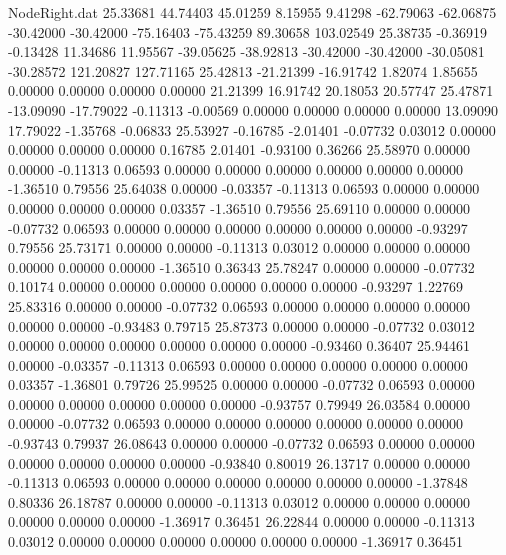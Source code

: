 \begin{filecontents}{NodeRight.dat}
  25.33681   44.74403   45.01259     8.15955    9.41298  -62.79063  -62.06875  -30.42000  -30.42000  -75.16403  -75.43259   89.30658  103.02549
  25.38735   -0.36919   -0.13428    11.34686   11.95567  -39.05625  -38.92813  -30.42000  -30.42000  -30.05081  -30.28572  121.20827  127.71165
  25.42813  -21.21399  -16.91742     1.82074    1.85655    0.00000    0.00000    0.00000    0.00000   21.21399   16.91742   20.18053   20.57747
  25.47871  -13.09090  -17.79022    -0.11313   -0.00569    0.00000    0.00000    0.00000    0.00000   13.09090   17.79022   -1.35768   -0.06833
  25.53927   -0.16785   -2.01401    -0.07732    0.03012    0.00000    0.00000    0.00000    0.00000    0.16785    2.01401   -0.93100    0.36266
  25.58970    0.00000    0.00000    -0.11313    0.06593    0.00000    0.00000    0.00000    0.00000    0.00000    0.00000   -1.36510    0.79556
  25.64038    0.00000   -0.03357    -0.11313    0.06593    0.00000    0.00000    0.00000    0.00000    0.00000    0.03357   -1.36510    0.79556
  25.69110    0.00000    0.00000    -0.07732    0.06593    0.00000    0.00000    0.00000    0.00000    0.00000    0.00000   -0.93297    0.79556
  25.73171    0.00000    0.00000    -0.11313    0.03012    0.00000    0.00000    0.00000    0.00000    0.00000    0.00000   -1.36510    0.36343
  25.78247    0.00000    0.00000    -0.07732    0.10174    0.00000    0.00000    0.00000    0.00000    0.00000    0.00000   -0.93297    1.22769
  25.83316    0.00000    0.00000    -0.07732    0.06593    0.00000    0.00000    0.00000    0.00000    0.00000    0.00000   -0.93483    0.79715
  25.87373    0.00000    0.00000    -0.07732    0.03012    0.00000    0.00000    0.00000    0.00000    0.00000    0.00000   -0.93460    0.36407
  25.94461    0.00000   -0.03357    -0.11313    0.06593    0.00000    0.00000    0.00000    0.00000    0.00000    0.03357   -1.36801    0.79726
  25.99525    0.00000    0.00000    -0.07732    0.06593    0.00000    0.00000    0.00000    0.00000    0.00000    0.00000   -0.93757    0.79949
  26.03584    0.00000    0.00000    -0.07732    0.06593    0.00000    0.00000    0.00000    0.00000    0.00000    0.00000   -0.93743    0.79937
  26.08643    0.00000    0.00000    -0.07732    0.06593    0.00000    0.00000    0.00000    0.00000    0.00000    0.00000   -0.93840    0.80019
  26.13717    0.00000    0.00000    -0.11313    0.06593    0.00000    0.00000    0.00000    0.00000    0.00000    0.00000   -1.37848    0.80336
  26.18787    0.00000    0.00000    -0.11313    0.03012    0.00000    0.00000    0.00000    0.00000    0.00000    0.00000   -1.36917    0.36451
  26.22844    0.00000    0.00000    -0.11313    0.03012    0.00000    0.00000    0.00000    0.00000    0.00000    0.00000   -1.36917    0.36451

\end{filecontents}
